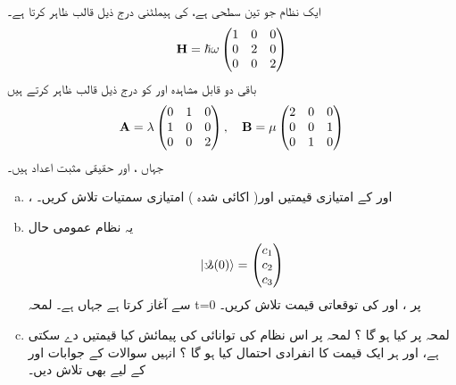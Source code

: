 ایک نظام جو تین سطحی ہے، کی ہیملٹنی درج ذیل قالب ظاہر کرتا ہے۔ 
 \begin{align*} 
\operatorname{\mathbf{H}}=\hslash\omega\begin{pmatrix}
1&0&0\\
0&2&0\\
0&0&2
\end{pmatrix} 
 \end{align*} 
باقی دو قابل مشاہدہ  اور  کو درج ذیل قالب ظاہر کرتے ہیں 
 \begin{align*} 
\operatorname{\mathbf{A}}=\lambda\begin{pmatrix}
0&1&0\\
1&0&0\\
0&0&2
\end{pmatrix} ,\quad \operatorname{\mathbf{B}}=\mu\begin{pmatrix}
2&0&0\\
0&0&1\\
0&1&0
\end{pmatrix}
 \end{align*} 
جہاں ،  اور  حقیقی مثبت اعداد ہیں۔
\begin{enumerate}[a.]
\item
{}،  اور  کے امتیازی قیمتیں اور( اکائی شدہ ) امتیازی سمتیات تلاش کریں۔ 
 \item
 یہ نظام عمومی حال
 \begin{align*} 
| \s(0) \rangle=\begin{pmatrix}
c_{1}\\
c_{2}\\
c_{3}
\end{pmatrix} 
 \end{align*} 
سے آغاز کرتا ہے جہاں  ہے۔ لمحہ t=0 پر ،  اور کی توقعاتی قیمت تلاش کریں۔ 
\item
 لمحہ  پر  کیا ہو گا ؟ لمحہ پر اس نظام کی توانائی کی پیمائش کیا قیمتیں دے سکتی ہے، اور ہر ایک قیمت کا انفرادی احتمال کیا ہو گا ؟ انہیں سوالات کے جوابات  اور  کے لیے بھی تلاش دیں۔
 \end{enumerate}


